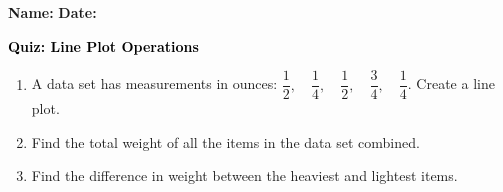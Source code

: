 \documentclass[12pt, letterpaper, fleqn]{article}
\begin{document}
\textbf{Name:} \underline{\hspace{5cm}}
\hfill
\textbf{Date:} \underline{\hspace{3cm}}\\

\begin{tcolorbox}[colback=customteal!20]
    \large\textcolor{black}{\textbf{Quiz: Line Plot Operations}}
\end{tcolorbox}
\begin{enumerate}[itemsep=3.5cm, leftmargin=0.6cm]
\item A data set has measurements in ounces: $\dfrac{1}{2}, \quad \dfrac{1}{4}, \quad \dfrac{1}{2}, \quad \dfrac{3}{4}, \quad \dfrac{1}{4}$. Create a line plot.
\vspace{4cm}
\item Find the total weight of all the items in the data set combined.
\vspace{3cm}
\item Find the difference in weight between the heaviest and lightest items.
\end{enumerate}
\end{document}
